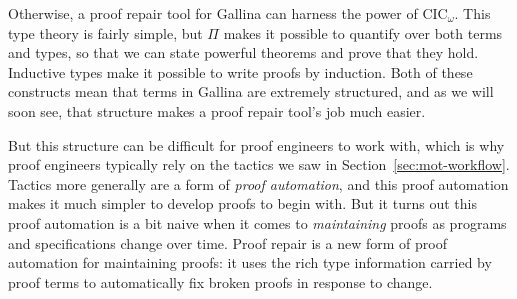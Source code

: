 Otherwise, a proof repair tool for Gallina can harness the power of CIC$_{\omega}$. This type theory is fairly simple,
but $\Pi$ makes it possible to quantify over both terms and types,
so that we can state powerful theorems and prove that they hold.
Inductive types make it possible to write proofs by induction.
Both of these constructs mean that terms in Gallina are extremely structured,
and as we will soon see, that structure makes a proof repair tool's job much easier.

But this structure can be difficult for proof engineers to work with,
which is why proof engineers typically rely on the tactics we saw in Section~\ref{sec:mot-workflow}.
Tactics more generally are a form of \textit{proof automation}, and this proof automation makes it much
simpler to develop proofs to begin with.
But it turns out this proof automation is a bit naive when it comes to \textit{maintaining} proofs
as programs and specifications change over time.
Proof repair is a new form of proof automation for maintaining proofs: it uses the rich type information carried by proof terms
to automatically fix broken proofs in response to change.


